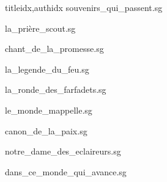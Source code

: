 \documentclass[
    ]{article}
\begin{document}
\begin{songs}{titleidx,authidx}
{souvenirs_qui_passent.sg}


{la_prière_scout.sg}


{chant_de_la_promesse.sg}


{la_legende_du_feu.sg}


{la_ronde_des_farfadets.sg}


{le_monde_mappelle.sg}


{canon_de_la_paix.sg}


{notre_dame_des_eclaireurs.sg}


{dans_ce_monde_qui_avance.sg}

\end{songs}
\end{document}
